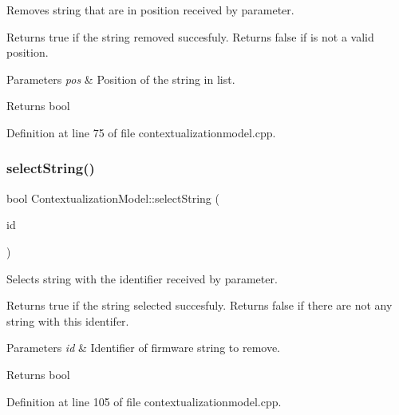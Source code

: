 Removes string that are in position received by parameter. 

Returns true if the string removed succesfuly. Returns false if is not a valid position. 
\begin{DoxyParams}{Parameters}
{\em pos} & Position of the string in list. \\
\hline
\end{DoxyParams}
\begin{DoxyReturn}{Returns}
bool 
\end{DoxyReturn}


Definition at line 75 of file contextualizationmodel.\+cpp.

\mbox{\label{classContextualizationModel_a4aafa9c9e08d2b7a52b17871f755f34b}} 
\subsubsection{\texorpdfstring{select\+String()}{selectString()}}
{\footnotesize\ttfamily bool Contextualization\+Model\+::select\+String (\begin{DoxyParamCaption}\item[{const Q\+String}]{id }\end{DoxyParamCaption})}



Selects string with the identifier received by parameter. 

Returns true if the string selected succesfuly. Returns false if there are not any string with this identifer. 
\begin{DoxyParams}{Parameters}
{\em id} & Identifier of firmware string to remove. \\
\hline
\end{DoxyParams}
\begin{DoxyReturn}{Returns}
bool 
\end{DoxyReturn}


Definition at line 105 of file contextualizationmodel.\+cpp.

\mbox{\label{classContextualizationModel_a0d3ac87546d9b527c23cc69d0e4e0954}} 
